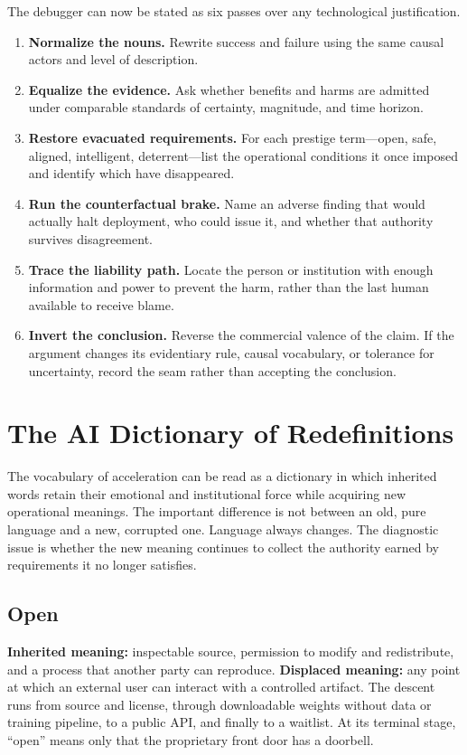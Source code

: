 \documentclass[11pt]{article}
\begin{document}
The debugger can now be stated as six passes over any technological justification.

\begin{enumerate}[label=\textbf{\arabic*.},leftmargin=2em,itemsep=0.7em]
  \item \textbf{Normalize the nouns.} Rewrite success and failure using the same causal actors and level of description.
  \item \textbf{Equalize the evidence.} Ask whether benefits and harms are admitted under comparable standards of certainty, magnitude, and time horizon.
  \item \textbf{Restore evacuated requirements.} For each prestige term---open, safe, aligned, intelligent, deterrent---list the operational conditions it once imposed and identify which have disappeared.
  \item \textbf{Run the counterfactual brake.} Name an adverse finding that would actually halt deployment, who could issue it, and whether that authority survives disagreement.
  \item \textbf{Trace the liability path.} Locate the person or institution with enough information and power to prevent the harm, rather than the last human available to receive blame.
  \item \textbf{Invert the conclusion.} Reverse the commercial valence of the claim. If the argument changes its evidentiary rule, causal vocabulary, or tolerance for uncertainty, record the seam rather than accepting the conclusion.
\end{enumerate}

\section{The AI Dictionary of Redefinitions}

The vocabulary of acceleration can be read as a dictionary in which inherited words retain their emotional and institutional force while acquiring new operational meanings. The important difference is not between an old, pure language and a new, corrupted one. Language always changes. The diagnostic issue is whether the new meaning continues to collect the authority earned by requirements it no longer satisfies.

\subsection*{Open}

\textbf{Inherited meaning:} inspectable source, permission to modify and redistribute, and a process that another party can reproduce. \textbf{Displaced meaning:} any point at which an external user can interact with a controlled artifact. The descent runs from source and license, through downloadable weights without data or training pipeline, to a public API, and finally to a waitlist. At its terminal stage, \enquote{open} means only that the proprietary front door has a doorbell.
\end{document}
